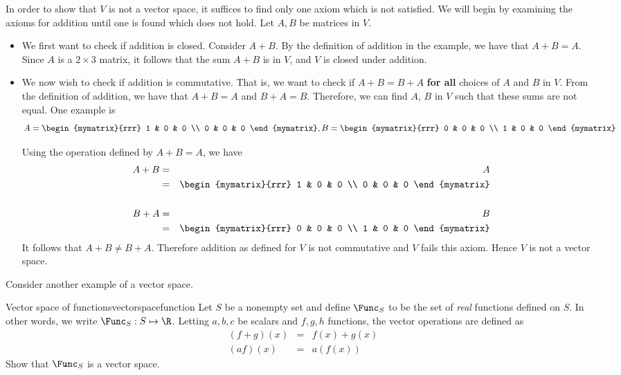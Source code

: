 \begin{solution}
In order to show that $V$ is not a vector space, it suffices to find only one axiom which is not satisfied. We will begin by examining the axioms for addition until one is found which does not hold. Let $A,B$ be matrices in $V$. 

\begin{itemize}
\item
We first want to check if addition is closed. Consider $A+B$. By the definition of addition in the example, we have that $A+B = A$. Since $A$ is a $2 \times 3$ matrix, it follows that the sum $A+B$ is in $V$, and $V$ is closed under addition. 

\item
We now wish to check if addition is commutative. That is, we want to check if $A + B = B + A$ \textbf{for all} choices of $A$ and $B$ in $V$. From the definition of addition, we have that $A + B = A$ and $B + A = B$. Therefore, we can find $A$, $B$ in $V$ such that these sums are not equal. One example is 
\[
A = \begin{mymatrix}{rrr}
1 & 0 & 0 \\
0 & 0 & 0 
\end{mymatrix}, B = \begin{mymatrix}{rrr}
0 & 0 & 0 \\
1 & 0 & 0 
\end{mymatrix}
\]

Using the operation defined by $A+B=A$, we have 
\begin{eqnarray*}
A+B &=& A \\
&=& \begin{mymatrix}{rrr}
1 & 0 & 0 \\
0 & 0 & 0 
\end{mymatrix} \\
\\
B+A &=& B \\
&=& \begin{mymatrix}{rrr}
0 & 0 & 0 \\
1 & 0 & 0 
\end{mymatrix}
\end{eqnarray*}
It follows that $A+B \neq B+A$. Therefore addition as defined for $V$ is not commutative and $V$ fails this axiom. Hence $V$ is not a vector space.
\end{itemize}
\end{solution}

Consider another example of a vector space. 

\begin{example}{Vector space of functions}{vectorspacefunction}
Let $S$ be a nonempty set and define $\Func_S$ to be the set of \textit{real} functions
defined on $S$. In other words, we write $\Func_S: S \mapsto \R$. Letting $a,b,c$ be scalars and $f,g,h$ functions, the
vector operations are defined as
\begin{eqnarray*}
\left( f+g\right) \left( x\right)  &=&f\left( x\right) +g\left(
x\right)  \\
\left( af\right) \left( x\right)  &=&a\left( f\left( x\right) \right)
\end{eqnarray*}
Show that $\Func_S$ is a vector space. 
\end{example}

